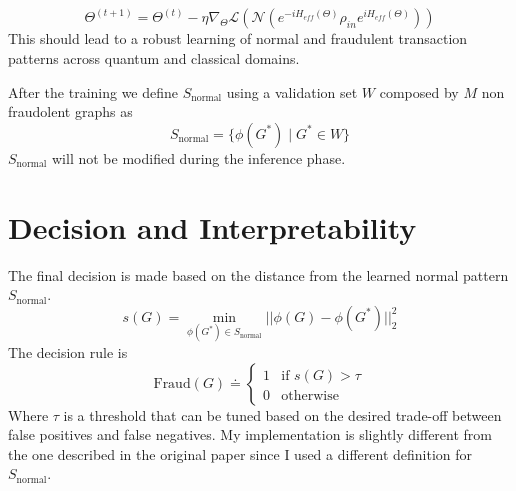 \begin{equation}
    \Theta^{(t+1)} = \Theta^{(t)} - \eta \nabla_{\Theta} \mathcal{L}\left( \mathcal{N}\left( e^{-i H_{eff}(\Theta)} \rho_{in} e^{i H_{eff}(\Theta)} \right) \right)
\end{equation}
This should lead to a robust learning of normal and fraudulent transaction patterns across quantum and classical domains.

After the training we define \(S_\text{normal}\) using a validation set \(W\) composed by \(M\) non fraudolent graphs as
\begin{equation}
    S_\text{normal} = \{\phi(G^*) \;|\; G^* \in W\}
\end{equation}
\(S_\text{normal}\) will not be modified during the inference phase.

\section{Decision and Interpretability}
The final decision is made based on the distance from the learned normal pattern \(S_\text{normal}\).
\begin{equation}
    s(G) = \min_{\phi(G^*) \in S_\text{normal}} ||\phi(G) - \phi(G^*)||^2_2
\end{equation}
The decision rule is
\begin{equation}
    \text{Fraud}(G) \doteq \begin{cases}
        1 & \text{if } s(G) > \tau \\
        0 & \text{otherwise}
    \end{cases}
\end{equation}
Where \(\tau\) is a threshold that can be tuned based on the desired trade-off between false positives and false negatives.
My implementation is slightly different from the one described in the original paper since I used a different definition for \(S_\text{normal}\).
